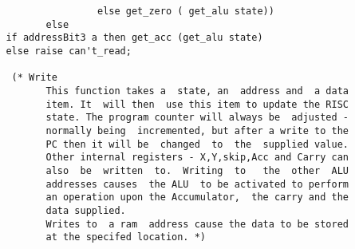 \begin{verbatim}
                         else get_zero ( get_alu state)) 
                else  
		 if addressBit3 a then get_acc (get_alu state)
		 else raise can't_read; 

          (* Write 
                This function takes a  state, an  address and  a data
                item. It  will then  use this item to update the RISC
                state. The program counter will always be  adjusted -
                normally being  incremented, but after a write to the
                PC then it will be  changed  to  the  supplied value.
                Other internal registers - X,Y,skip,Acc and Carry can
                also  be  written  to.  Writing  to   the  other  ALU
                addresses causes  the ALU  to be activated to perform
                an operation upon the Accumulator,  the carry and the
                data supplied.
                Writes to  a ram  address cause the data to be stored
                at the specifed location. *)


\end{verbatim}
